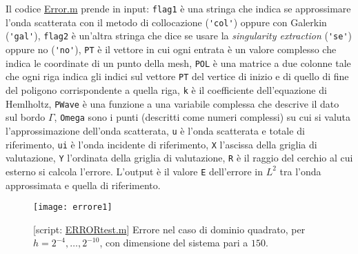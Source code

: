 Il codice \href{https://github.com/Daldossi/BEM/blob/main/Error.m}{Error.m} prende in input: \verb|flag1| è una stringa che indica se approssimare l'onda scatterata con il metodo di collocazione (\verb|'col'|) oppure con Galerkin (\verb|'gal'|), \verb|flag2| è un'altra stringa che dice se usare la \textit{singularity extraction} (\verb|'se'|) oppure no (\verb|'no'|), \verb|PT| è il vettore in cui ogni entrata è un valore complesso che indica le coordinate di un punto della mesh, \verb|POL| è una matrice a due colonne tale che ogni riga indica gli indici sul vettore \verb|PT| del vertice di inizio e di quello di fine del poligono corrispondente a quella riga, \verb|k| è il coefficiente dell'equazione di Hemlholtz, \verb|PWave| è una funzione a una variabile complessa che descrive il dato sul bordo $\Gamma$, \verb|Omega| sono i punti (descritti come numeri complessi) su cui si valuta l'approssimazione dell'onda scatterata, \verb|u| è l'onda scatterata e totale di riferimento, \verb|ui| è l'onda incidente di riferimento, \verb|X| l'ascissa della griglia di valutazione, \verb|Y| l'ordinata della griglia di valutazione, \verb|R| è il raggio del cerchio al cui esterno si calcola l'errore. L'output è il valore \verb|E| dell'errore in $L^2$ tra l'onda approssimata e quella di riferimento. 

\begin{figure}
	\centering
	\texttt{[image: errore1]}
	\caption{[script: \href{https://github.com/Daldossi/BEM/blob/main/Error_test.m}{ERRORtest.m}] Errore nel caso di dominio quadrato, per $h=2^{-4},\dots,2^{-10}$, con dimensione del sistema pari a $150$. }
	\label{fig_errore1}
\end{figure}


